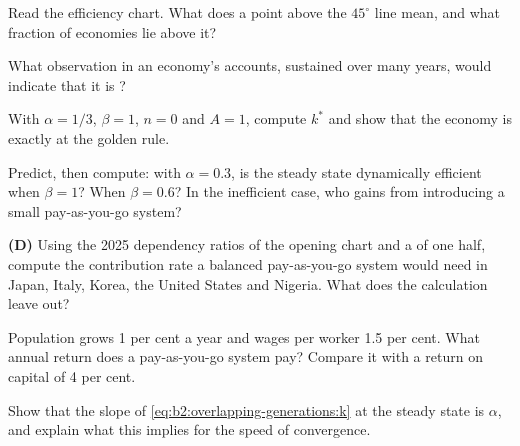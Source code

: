 \begin{exercise}[$\star$]\label{exo:b2:overlapping-generations:3}
Read the efficiency chart. What does a point above the $45^\circ$ line mean, and what fraction of economies lie above it?
\end{exercise}

\begin{exercise}[$\star$]\label{exo:b2:overlapping-generations:4}
What observation in an economy's accounts, sustained over many years, would indicate that it is ?
\end{exercise}

\begin{exercise}[$\star\star$]\label{exo:b2:overlapping-generations:5}
With $\alpha = 1/3$, $\beta = 1$, $n = 0$ and $A = 1$, compute $k^*$ and show that the economy is exactly at the golden rule.
\end{exercise}

\begin{exercise}[$\star\star$]\label{exo:b2:overlapping-generations:6}
Predict, then compute: with $\alpha = 0.3$, is the steady state dynamically efficient when $\beta = 1$? When $\beta = 0.6$? In the inefficient case, who gains from introducing a
small pay-as-you-go system?
\end{exercise}

\begin{exercise}[$\star\star$]\label{exo:b2:overlapping-generations:7}
\textbf{(D)} Using the 2025 dependency ratios of the opening chart and a  of one half, compute the
contribution rate a balanced pay-as-you-go system would need in Japan, Italy, Korea, the United States and Nigeria. What
does the calculation leave out?
\end{exercise}

\begin{exercise}[$\star\star$]\label{exo:b2:overlapping-generations:8}
Population grows 1 per cent a year and wages per worker 1.5 per cent. What annual return does a pay-as-you-go system pay? Compare
it with a return on capital of 4 per cent.
\end{exercise}

\begin{exercise}[$\star\star$]\label{exo:b2:overlapping-generations:9}
Show that the slope of \eqref{eq:b2:overlapping-generations:k} at the steady state is $\alpha$, and explain what this implies for the speed of convergence.
\end{exercise}

